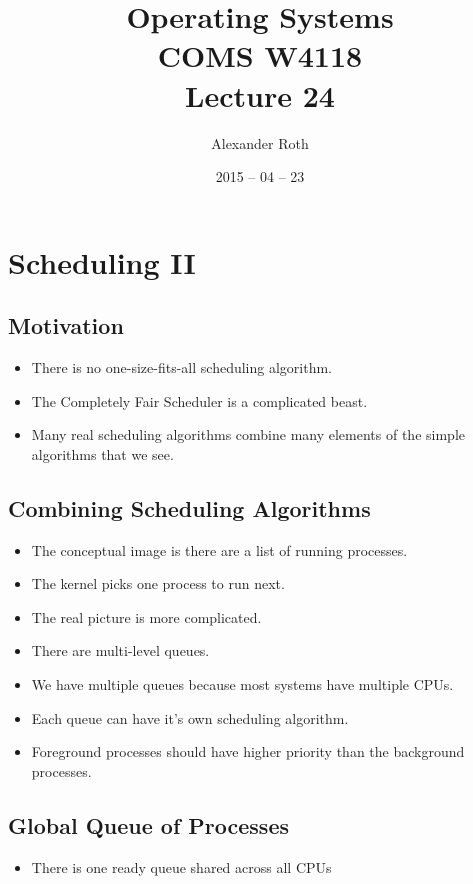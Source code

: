 \documentclass[]{article}
\begin{document}
\newtheorem{thm}{Theorem}
\title{Operating Systems \\ COMS W4118 \\ Lecture 24}
\author{Alexander Roth}
\date{2015 -- 04 -- 23}
\maketitle

\section{Scheduling II}
\subsection{Motivation}
\begin{itemize}
\item There is no one-size-fits-all scheduling algorithm.
\item The Completely Fair Scheduler is a complicated beast.
\item Many real scheduling algorithms combine many elements of the simple algorithms that we see.
\end{itemize}

\subsection{Combining Scheduling Algorithms}
\begin{itemize}
\item The conceptual image is there are a list of running processes.
\item The kernel picks one process to run next.
\item The real picture is more complicated.
\item There are multi-level queues.
\item We have multiple queues because most systems have multiple CPUs.
\item Each queue can have it's own scheduling algorithm.
\item Foreground processes should have higher priority than the background processes.
\end{itemize}

\subsection{Global Queue of Processes}
\begin{itemize}
\item There is one ready queue shared across all CPUs
\end{itemize}
\end{document}
